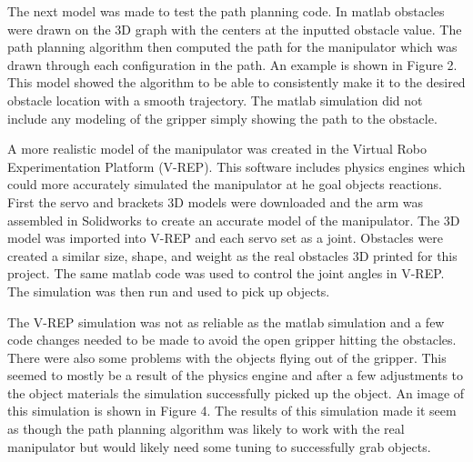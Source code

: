 \documentclass[letterpaper,12pt]{report}
\begin{document}
The next model was made to test the path planning code. In matlab obstacles were drawn on the 3D graph with the centers at the inputted obstacle value. The path planning algorithm then computed the path for the manipulator which was drawn through each configuration in the path. An example is shown in Figure 2. This model showed the algorithm to be able to consistently make it to the desired obstacle location with a smooth trajectory. The matlab simulation did not include any modeling of the gripper simply showing the path to the obstacle.

A more realistic model of the manipulator was created in the Virtual Robo Experimentation Platform (V-REP). This software includes physics engines which could more accurately simulated the manipulator at he goal objects reactions. First the servo and brackets 3D models were downloaded and the arm was assembled in Solidworks to create an accurate model of the manipulator. The 3D model was imported into V-REP and each servo set as a joint. Obstacles were created a similar size, shape, and weight as the real obstacles 3D printed for this project. The same matlab code was used to control the joint angles in V-REP. The simulation was then run and used to pick up objects. 

The V-REP simulation was not as reliable as the matlab simulation and a few code changes needed to be made to avoid the open gripper hitting the obstacles. There were also some problems with the objects flying out of the gripper. This seemed to mostly be a result of the physics engine and after a few adjustments to the object materials the simulation successfully picked up the object. An image of this simulation is shown in Figure 4. The results of this simulation made it seem as though the path planning algorithm was likely to work with the real manipulator but would likely need some tuning to successfully grab objects. 
\end{document}
